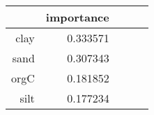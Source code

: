 \begin{tabular}{rrrrr}
\toprule
 & importance \\
\midrule
clay & 0.333571 \\
sand & 0.307343 \\
orgC & 0.181852 \\
silt & 0.177234 \\
\bottomrule
\end{tabular}
